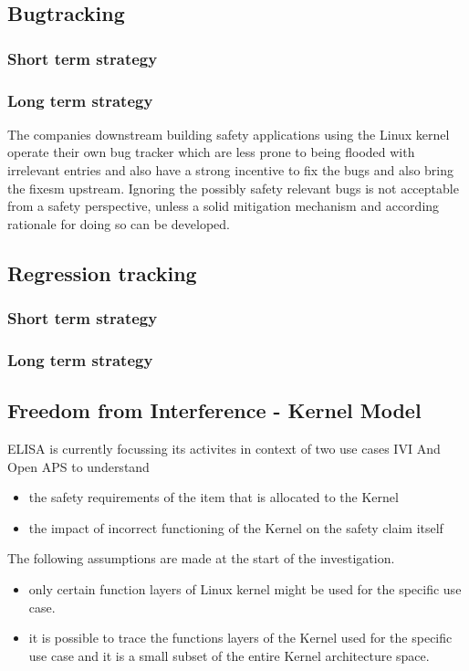 \documentclass[12pt]{ElisaPaper}
\begin{document}
\subsection{Bugtracking}

\subsubsection{Short term strategy}

\subsubsection{Long term strategy}
The companies downstream building safety applications using the Linux kernel operate their own bug tracker which are less prone to being flooded with irrelevant entries and also have a strong incentive to fix the bugs and also bring the fixesm upstream. 
Ignoring the possibly safety relevant bugs is not acceptable from a safety perspective, unless a solid mitigation mechanism and according rationale for doing so can be developed.

\subsection{Regression tracking}
\subsubsection{Short term strategy}
\subsubsection{Long term strategy}  

\subsection{Freedom from Interference - Kernel Model}
ELISA is currently focussing its activites in context of two use cases IVI And Open APS to understand
\begin{itemize} 
	\item the safety requirements of the item that is allocated to the Kernel
	\item the impact of incorrect functioning of the Kernel on the safety claim itself 
\end{itemize}
The following assumptions are made at the start of the investigation.
\begin{itemize}
	\item 	only certain function layers of Linux kernel might be used for the specific use case. 
	\item 	it is possible to trace the functions layers of the Kernel used for the specific use case and it is a small subset of the entire Kernel architecture space.
\end{itemize} 
\end{document}
